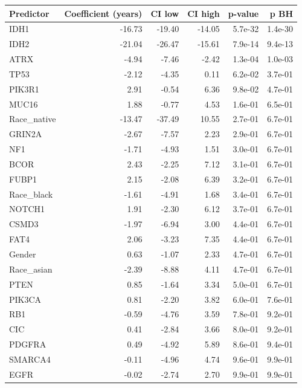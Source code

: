 \begin{tabular}{lrrrrr}
\toprule
\textbf{Predictor} & \textbf{Coefficient (years)} & \textbf{CI low} & \textbf{CI high} & \textbf{p-value} & \textbf{p BH} \\
\midrule
IDH1 & -16.73 & -19.40 & -14.05 & 5.7e-32 & 1.4e-30 \\
IDH2 & -21.04 & -26.47 & -15.61 & 7.9e-14 & 9.4e-13 \\
ATRX & -4.94 & -7.46 & -2.42 & 1.3e-04 & 1.0e-03 \\
TP53 & -2.12 & -4.35 & 0.11 & 6.2e-02 & 3.7e-01 \\
PIK3R1 & 2.91 & -0.54 & 6.36 & 9.8e-02 & 4.7e-01 \\
MUC16 & 1.88 & -0.77 & 4.53 & 1.6e-01 & 6.5e-01 \\
Race\_native & -13.47 & -37.49 & 10.55 & 2.7e-01 & 6.7e-01 \\
GRIN2A & -2.67 & -7.57 & 2.23 & 2.9e-01 & 6.7e-01 \\
NF1 & -1.71 & -4.93 & 1.51 & 3.0e-01 & 6.7e-01 \\
BCOR & 2.43 & -2.25 & 7.12 & 3.1e-01 & 6.7e-01 \\
FUBP1 & 2.15 & -2.08 & 6.39 & 3.2e-01 & 6.7e-01 \\
Race\_black & -1.61 & -4.91 & 1.68 & 3.4e-01 & 6.7e-01 \\
NOTCH1 & 1.91 & -2.30 & 6.12 & 3.7e-01 & 6.7e-01 \\
CSMD3 & -1.97 & -6.94 & 3.00 & 4.4e-01 & 6.7e-01 \\
FAT4 & 2.06 & -3.23 & 7.35 & 4.4e-01 & 6.7e-01 \\
Gender & 0.63 & -1.07 & 2.33 & 4.7e-01 & 6.7e-01 \\
Race\_asian & -2.39 & -8.88 & 4.11 & 4.7e-01 & 6.7e-01 \\
PTEN & 0.85 & -1.64 & 3.34 & 5.0e-01 & 6.7e-01 \\
PIK3CA & 0.81 & -2.20 & 3.82 & 6.0e-01 & 7.6e-01 \\
RB1 & -0.59 & -4.76 & 3.59 & 7.8e-01 & 9.2e-01 \\
CIC & 0.41 & -2.84 & 3.66 & 8.0e-01 & 9.2e-01 \\
PDGFRA & 0.49 & -4.92 & 5.89 & 8.6e-01 & 9.4e-01 \\
SMARCA4 & -0.11 & -4.96 & 4.74 & 9.6e-01 & 9.9e-01 \\
EGFR & -0.02 & -2.74 & 2.70 & 9.9e-01 & 9.9e-01 \\
\bottomrule
\end{tabular}
